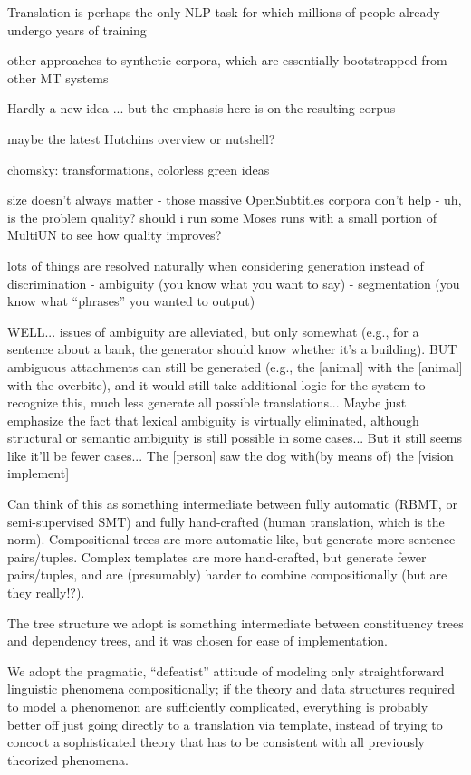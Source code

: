Translation is perhaps the only NLP task for which millions of people already undergo years of training

other approaches to synthetic corpora, which are essentially bootstrapped from other MT systems

Hardly a new idea ... but the emphasis here is on the resulting corpus





maybe the latest Hutchins overview or nutshell?


chomsky: transformations, colorless green ideas


size doesn't always matter - those massive OpenSubtitles corpora don't help
- uh, is the problem quality? should i run some Moses runs with a small portion of MultiUN to see how quality improves?

lots of things are resolved naturally when considering generation instead of discrimination
- ambiguity (you know what you want to say)
- segmentation (you know what ``phrases'' you wanted to output)

WELL... issues of ambiguity are alleviated, but only somewhat (e.g., for a sentence about a bank, the generator should know whether it's a building). 
BUT ambiguous attachments can still be generated (e.g., the [animal] with the [animal] with the overbite), and it would still take additional logic for the system to recognize this, much less generate all possible translations...
Maybe just emphasize the fact that lexical ambiguity is virtually eliminated, although structural or semantic ambiguity is still possible in some cases...
But it still seems like it'll be fewer cases... The [person] saw the dog with(by means of) the [vision implement]


Can think of this as something intermediate between fully automatic (RBMT, or semi-supervised SMT) and fully hand-crafted (human translation, which is the norm).
Compositional trees are more automatic-like, but generate more sentence pairs/tuples.
Complex templates are more hand-crafted, but generate fewer pairs/tuples, and are (presumably) harder to combine compositionally (but are they really!?).

The tree structure we adopt is something intermediate between constituency trees and dependency trees, and it was chosen for ease of implementation.

We adopt the pragmatic, ``defeatist'' attitude of modeling only straightforward linguistic phenomena compositionally; if the theory and data structures required to model a phenomenon are sufficiently complicated, everything is probably better off just going directly to a translation via template, instead of trying to concoct a sophisticated theory that has to be consistent with all previously theorized phenomena.

